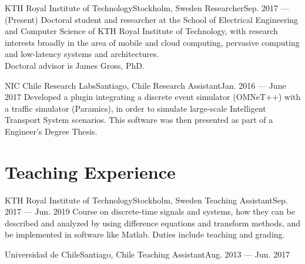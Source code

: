 \documentclass[letterpaper,11pt]{article}
\begin{document}
\resumeSubheading
{KTH Royal Institute of Technology}{Stockholm, Sweden}
{Researcher}{Sep. 2017 --- (Present)}
\resumeItemListStart
{}
{Doctoral student and researcher at the School of Electrical Engineering and Computer Science of KTH Royal Institute of Technology, with research interests broadly in the area of mobile and cloud computing, pervasive computing and low-latency systems and architectures.\\
Doctoral advisor is James Gross, PhD.}
\resumeItemListEnd

\resumeSubheading
{NIC Chile Research Labs}{Santiago, Chile}
{Research Assistant}{Jan. 2016 --- June 2017}
\resumeItemListStart
{}
{Developed a plugin integrating a discrete event simulator (OMNeT++) with a traffic simulator (Paramics), in order to simulate large-scale Intelligent Transport System scenarios.
This software was then presented as part of a Engineer's Degree Thesis.}
\resumeItemListEnd
\resumeSubHeadingListEnd


\section{Teaching Experience}
\resumeSubHeadingListStart

\resumeSubheading
{KTH Royal Institute of Technology}{Stockholm, Sweden}
{Teaching Assistant}{Sep. 2017 --- Jun. 2019}
\resumeItemListStart
{}
{Course on discrete-time signals and systems, how they can be described and analyzed by using difference equations and transform methods, and be implemented in software like Matlab.
Duties include teaching and grading.}
\resumeItemListEnd

\resumeSubheading
{Universidad de Chile}{Santiago, Chile}
{Teaching Assistant}{Aug. 2013 --- Jun. 2017}
\resumeItemListStart
{}
\resumeItemListEnd
\resumeSubHeadingListEnd
\end{document}
